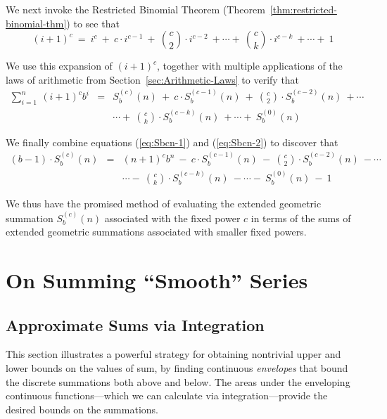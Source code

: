 %
We next invoke the Restricted Binomial Theorem
(Theorem~\ref{thm:restricted-binomial-thm}) to see that
\[ (i+1)^c \ = \ i^c \ + \ c \cdot i^{c-1} \ + \ {c \choose 2} \cdot
i^{c-2} \ + \cdots + \ {c \choose k} \cdot i^{c-k}  \ + \cdots + \ 1
\]

We use this expansion of $(i+1)^c$, together with multiple
applications of the laws of arithmetic from
Section~\ref{sec:Arithmetic-Laws} to verify that
\begin{eqnarray}
\nonumber
\sum_{i=1}^n \ (i+1)^c b^{i} & = &
S_b^{(c)}(n)
 \ + \ c \cdot S_b^{(c-1)}(n)
 \ + \ {c \choose 2} \cdot S_b^{(c-2)}(n)  \ + \cdots \\
\label{eq:Sbcn-2}
  &  & \cdots + \
{c \choose k} \cdot S_b^{(c-k)}(n)
 \ + \cdots + \
S_b^{(0)}(n)
\end{eqnarray}

%
We finally combine equations (\ref{eq:Sbcn-1}) and (\ref{eq:Sbcn-2})
to discover that
\begin{eqnarray}
\nonumber
(b-1) \cdot S_b^{(c)}(n)
 & = &
(n+1)^{c} b^{n} \ - \
c \cdot S_b^{(c-1)}(n)
 \ - \ {c \choose 2} \cdot S_b^{(c-2)}(n)  \ - \cdots \\
\label{eq:Sbcn-3}
  &  & 
\cdots - \
{c \choose k} \cdot S_b^{(c-k)}(n)
 \ - \cdots - \
S_b^{(0)}(n)
\ - \ 1
\end{eqnarray}

We thus have the promised method of evaluating the extended geometric
summation $S_b^{(c)}(n)$ associated with the fixed power $c$ in terms
of the sums of extended geometric summations associated with smaller
fixed powers.


\section{On Summing ``Smooth'' Series}
\label{sec:smooth-series}

\subsection{Approximate Sums via Integration}
\label{sec:riemann-bounds}

This section illustrates a powerful strategy for obtaining nontrivial
upper and lower bounds on the values of sum, by finding continuous {\em
  envelopes} that bound the discrete summations both above and below.
The areas under the enveloping continuous functions---which we can
calculate via integration---provide the desired bounds on the
summations.


